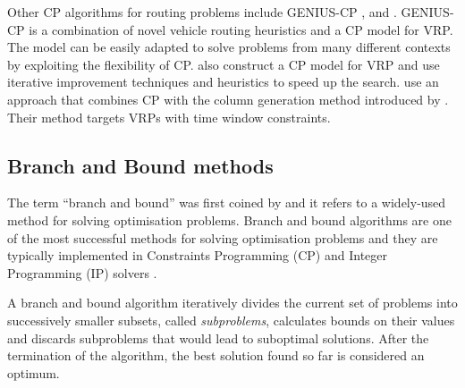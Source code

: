 \documentclass{mpaper}
\begin{document}
Other CP algorithms for routing problems include GENIUS-CP \citep{Pesant1997}, \citet{Backer2000} and \citet{rousseau2002solving}.
GENIUS-CP \cite{Pesant1997} is a combination of novel vehicle routing heuristics and a CP model for VRP. The model can be easily adapted to solve problems from many different contexts by exploiting the flexibility of CP. \citet{Backer2000} also construct a CP model for VRP and use iterative improvement techniques and heuristics to speed up the search. \citet{rousseau2002solving} use an approach that combines CP with the column generation method introduced by \citet{dantzig1960decomposition}. Their method targets VRPs with time window constraints.

\subsection{Branch and Bound methods}

The term ``branch and bound'' was first coined by \citet{Little63} and it refers to a widely-used method for solving optimisation problems. Branch and bound algorithms are one of the most successful methods for solving optimisation problems \citep{Christofides81} and they are typically implemented in Constraints Programming (CP) and Integer Programming (IP) solvers \citep{Atamturk2005,Leyffer01,Quesada92}.

A branch and bound algorithm iteratively divides the current set of problems into successively smaller subsets, called \textit{subproblems}, calculates bounds on their values and discards subproblems that would lead to suboptimal solutions. After the termination of the algorithm, the best solution found so far is considered an optimum. %
\end{document}
